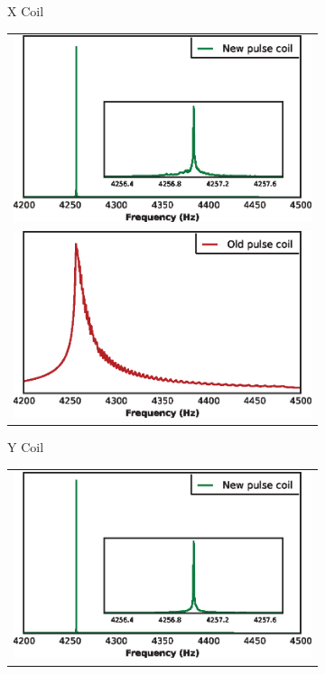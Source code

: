 \documentclass[PaulGanssle-Thesis.tex]{subfiles}
\begin{document}
\begin{figure}[t!]
\begin{subfigure}[h]{0.3\tw}
\begin{tabular}{c}
\end{tabular}
\caption{X Coil}
\label{fig:PCHomogeneityComparisonX}
\end{subfigure} 
\begin{subfigure}[h]{0.3\tw}
\begin{tabular}{c}
\includegraphics[width=\tw]{figures/coils/PCHomogeneityCompNY.eps}\\
\includegraphics[width=\tw]{figures/coils/PCHomogeneityCompOY.eps}
\end{tabular}
\caption{Y Coil}
\label{fig:PCHomogeneityComparisonY}
\end{subfigure}
\begin{subfigure}[h]{0.3\tw}
\begin{tabular}{c}
\includegraphics[width=\tw]{figures/coils/PCHomogeneityCompNZ.eps} \\

\end{tabular}
\end{subfigure}
\end{figure}
\end{document}
